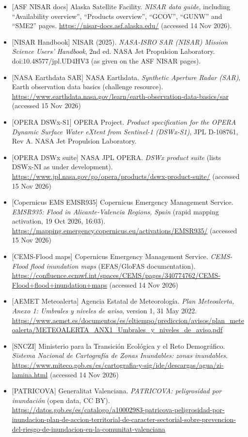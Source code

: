 \documentclass[10pt,twocolumn]{article}
\begin{document}
\begin{itemize}
\item{} [ASF NISAR docs] Alaska Satellite Facility. \emph{NISAR data guide}, including ``Availability overview'', ``Products overview'', ``GCOV'', ``GUNW'' and ``SME2'' pages. \url{https://nisar-docs.asf.alaska.edu/} (accessed 14 Nov 2026).
\item{} [NISAR Handbook] NISAR (2025). \emph{NASA-ISRO SAR (NISAR) Mission Science Users' Handbook}, 2nd ed. NASA Jet Propulsion Laboratory. doi:10.48577/jpl.UD4HV3 (as given on the ASF NISAR pages).
\item{} [NASA Earthdata SAR] NASA Earthdata. \emph{Synthetic Aperture Radar (SAR)}, Earth observation data basics (challenge resource). \url{https://www.earthdata.nasa.gov/learn/earth-observation-data-basics/sar} (accessed 15 Nov 2026)
\item{} [OPERA DSWx-S1] OPERA Project. \emph{Product specification for the OPERA Dynamic Surface Water eXtent from Sentinel-1 (DSWx-S1)}, JPL D-108761, Rev A. NASA Jet Propulsion Laboratory. \ddag{}
\item{} [OPERA DSWx suite] NASA JPL OPERA. \emph{DSWx product suite} (lists DSWx-NI as under development). \url{https://www.jpl.nasa.gov/go/opera/products/dswx-product-suite/} (accessed 15 Nov 2026)
\item{} [Copernicus EMS EMSR935] Copernicus Emergency Management Service. \emph{EMSR935: Flood in Alicante-Valencia Regions, Spain} (rapid mapping activation, 19 Oct 2026, 16:03). \url{https://mapping.emergency.copernicus.eu/activations/EMSR935/} (accessed 15 Nov 2026)
\item{} [CEMS-Flood maps] Copernicus Emergency Management Service. \emph{CEMS-Flood flood inundation maps} (EFAS/GloFAS documentation). \url{https://confluence.ecmwf.int/spaces/CEMS/pages/340774762/CEMS-Flood+flood+inundation+maps} (accessed 14 Nov 2026)
\item{} [AEMET Meteoalerta] Agencia Estatal de Meteorología. \emph{Plan Meteoalerta, Anexo 1: Umbrales y niveles de aviso}, version 1, 31 May 2022. \url{https://www.aemet.es/documentos/es/eltiempo/prediccion/avisos/plan_meteoalerta/METEOALERTA_ANX1_Umbrales_y_niveles_de_aviso.pdf}
\item{} [SNCZI] Ministerio para la Transición Ecológica y el Reto Demográfico. \emph{Sistema Nacional de Cartografía de Zonas Inundables: zonas inundables}. \url{https://www.miteco.gob.es/es/cartografia-y-sig/ide/descargas/agua/zi-lamina.html} (accessed 14 Nov 2026)
\item{} [PATRICOVA] Generalitat Valenciana. \emph{PATRICOVA: peligrosidad por inundación} (open data, CC BY). \url{https://datos.gob.es/es/catalogo/a10002983-patricova-peligrosidad-por-inundacion-plan-de-accion-territorial-de-caracter-sectorial-sobre-prevencion-del-riesgo-de-inundacion-en-la-comunitat-valenciana}

\end{itemize}
\end{document}
